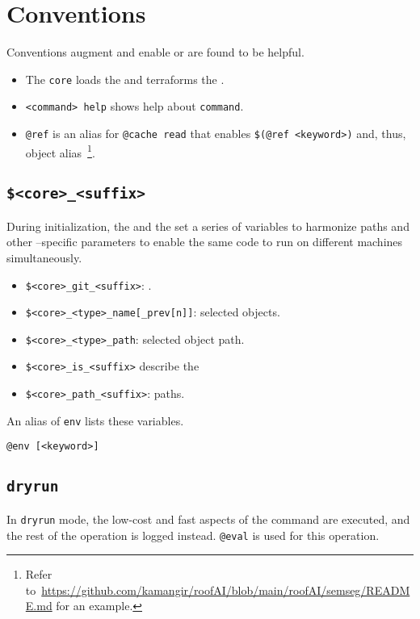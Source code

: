\section{Conventions}
\label{conventions}
\label{core}
\label{help}

Conventions augment and enable  or are found to be helpful.
%
\begin{itemize}
    \item The \texttt{core} loads the  and terraforms the .
    \item \texttt{<command> help} shows help about \texttt{command}.
    \item \texttt{@ref} is an alias for \texttt{@cache read} that enables \texttt{\$(@ref <keyword>)} and, thus, object alias~\footnote{Refer to~\url{https://github.com/kamangir/roofAI/blob/main/roofAI/semseg/README.md} for an example.}.
\end{itemize}  

\subsection{\texttt{\$<core>\_<suffix>}}
\label{awareness}

During initialization, the  and the  set a series of variables to harmonize paths and other --specific parameters to enable the same code to run on different machines simultaneously. 
%
\begin{itemize}
    \item{\texttt{\$<core>\_git\_<suffix>}: .}
    \item{\texttt{\$<core>\_<type>\_name[\_prev[n]]}: selected objects.}
    \item{\texttt{\$<core>\_<type>\_path}: selected object path.}
    \item{\texttt{\$<core>\_is\_<suffix>} describe the }
    \item{\texttt{\$<core>\_path\_<suffix>}: paths.}
\end{itemize}
%
An alias of \texttt{env} lists these variables.
%
\begin{verbatim}
@env [<keyword>]
\end{verbatim}

\subsection{\texttt{dryrun}}
\label{dryrun}

In \texttt{dryrun} mode, the low-cost and fast aspects of the command are executed, and the rest of the operation is logged instead. \texttt{@eval} is used for this operation. 








